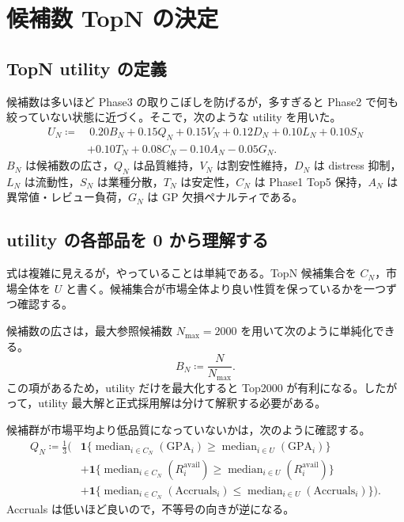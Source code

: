 \documentclass[a4paper,10pt]{article}
\newcommand{\metric}[1]{\mathrm{#1}}
\newcommand{\ind}[1]{\mathbf{1}\{#1\}}
\newcommand{\median}{\operatorname{median}}
\begin{document}
\section{候補数 TopN の決定}

\subsection{TopN utility の定義}
候補数は多いほど Phase3 の取りこぼしを防げるが，多すぎると Phase2 で何も絞っていない状態に近づく。そこで，次のような utility を用いた。
\begin{align}
U_N \coloneqq &\ 0.20B_N + 0.15Q_N + 0.15V_N + 0.12D_N + 0.10L_N + 0.10S_N \\
&+ 0.10T_N + 0.08C_N - 0.10A_N - 0.05G_N .
\end{align}
$B_N$ は候補数の広さ，$Q_N$ は品質維持，$V_N$ は割安性維持，$D_N$ は distress 抑制，$L_N$ は流動性，$S_N$ は業種分散，$T_N$ は安定性，$C_N$ は Phase1 Top5 保持，$A_N$ は異常値・レビュー負荷，$G_N$ は GP 欠損ペナルティである。

\subsection{utility の各部品を 0 から理解する}
式は複雑に見えるが，やっていることは単純である。TopN 候補集合を $C_N$，市場全体を $U$ と書く。候補集合が市場全体より良い性質を保っているかを一つずつ確認する。

候補数の広さは，最大参照候補数 $N_{\max}=2000$ を用いて次のように単純化できる。
\begin{equation}
B_N \coloneqq \frac{N}{N_{\max}} .
\end{equation}
この項があるため，utility だけを最大化すると Top2000 が有利になる。したがって，utility 最大解と正式採用解は分けて解釈する必要がある。

候補群が市場平均より低品質になっていないかは，次のように確認する。
\begin{align}
Q_N \coloneqq \frac{1}{3}\Big(&\ind{\median_{i\in C_N}(\metric{GPA}_i) \ge \median_{i\in U}(\metric{GPA}_i)} \\
&+\ind{\median_{i\in C_N}(R^{\mathrm{avail}}_i) \ge \median_{i\in U}(R^{\mathrm{avail}}_i)} \\
&+\ind{\median_{i\in C_N}(\metric{Accruals}_i) \le \median_{i\in U}(\metric{Accruals}_i)}\Big).
\end{align}
Accruals は低いほど良いので，不等号の向きが逆になる。
\end{document}
